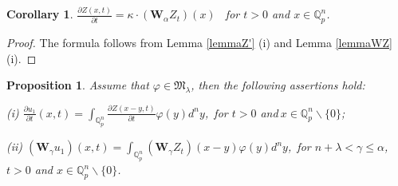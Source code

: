 \documentclass{amsart}\usepackage{amsfonts}
\theoremstyle{plain}
\newtheorem{corollary}[theorem]{Corollary}
\newtheorem{proposition}[theorem]{Proposition}
\numberwithin{equation}{section}
\begin{document}
\begin{corollary}
\label{coro1}$\frac{\partial Z(x,t)}{\partial t}=\kappa\cdot\left(
\mathbf{W}_{\alpha}Z_{t}\right)  (x)$ \ for $t>0$ and $x\in\mathbb{Q}_{p}^{n}$.
\end{corollary}

\begin{proof}
The formula follows from Lemma \ref{lemmaZ'} (i) and Lemma \ref{lemmaWZ} (i).
\end{proof}

\begin{proposition}
\label{u1}Assume that $\varphi\in\mathcal{\mathfrak{M}}_{\lambda}$, then the
following assertions hold:

(i) $\frac{\partial u_{1}}{\partial t}(x,t)={\textstyle\int\nolimits_{\mathbb{Q}_{p}^{n}}}
\frac{\partial Z(x-y,t)}{\partial t}\varphi(y)d^{n}y$,\ for $t>0$
and$\ x\in\mathbb{Q}_{p}^{n}\backslash\{0\}$;

(ii) $(\mathbf{W}_{\gamma}u_{1})(x,t)={\textstyle\int\nolimits_{\mathbb{Q}_{p}^{n}}}
(\mathbf{W}_{\gamma}Z_{t})(x-y)\varphi(y)d^{n}y$,\ for $n+\lambda<\gamma
\leq\alpha$, $t>0$ and $x\in\mathbb{Q}_{p}^{n}\backslash\{0\}$.
\end{proposition}
\end{document}
